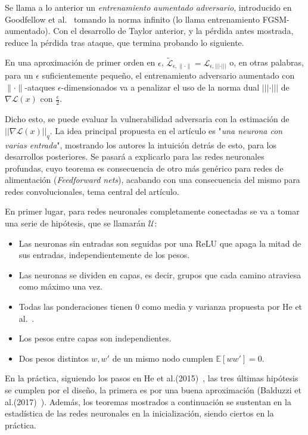 Se llama a lo anterior un \textit{entrenamiento aumentado adversario}, introducido en Goodfellow et al.~\cite{GoodfLAdvers} tomando la norma infinito (lo llama entrenamiento FGSM-aumentado). Con el desarrollo de Taylor anterior, y la pérdida antes mostrada, reduce la pérdida tras ataque, que termina probando lo siguiente.

\begin{proposicion}
En una aproximación de primer orden en $\epsilon$, $\tilde{\mathcal{L}}_{\epsilon,\| \cdot \|}=\mathcal{L}_{\epsilon,|||\cdot|||}$ o, en otras palabras, para un $\epsilon$ suficientemente pequeño, el entrenamiento adversario aumentado con $\| \cdot \|$-ataques $\epsilon$-dimensionados va a penalizar el uso de la norma dual $|||\cdot |||$ de $\nabla \mathcal{L}(x)$ con $\frac{\epsilon}{2}$.
\end{proposicion}

Dicho esto, se puede evaluar la vulnerabilidad adversaria con la estimación de $||\nabla \mathcal{L}(x)||_q$. La idea principal propuesta en el artículo es "\textit{una neurona con varias entrada}", mostrando los autores la intuición detrás de esto, para los desarrollos posteriores. Se pasará a explicarlo para las redes neuronales profundas, cuyo teorema es consecuencia de otro más genérico para redes de alimentación (\textit{Feedforward nets}), acabando con una consecuencia del mismo para redes convolucionales, tema central del artículo.

En primer lugar, para redes neuronales completamente conectadas se va a tomar una serie de hipótesis, que se llamarán $\mathcal{U}$:
\begin{itemize}
	\item  Las neuronas sin entradas son seguidas por una ReLU que apaga la mitad de sus entradas, independientemente de los pesos.
	\item Las neuronas se dividen en capas, es decir, grupos
que cada camino atraviesa como máximo una vez.
	\item Todas las ponderaciones tienen 0 como media y varianza propuesta por He et al.~\cite{HeLAdvers}.
	\item Los pesos entre capas son independientes.
	\item Dos pesos distintos $w,w'$ de un mismo nodo cumplen $\mathbb{E}[ww']=0$.
\end{itemize}

En la práctica, siguiendo los pasos en He et al.(2015)~\cite{HeLAdvers}, las tres últimas hipótesis se cumplen por el diseño, la primera es por una buena aproximación (Balduzzi et al.(2017)~\cite{BalduzziLAdvers}). Además, los teoremas mostrados a continuación se sustentan en la estadística de las redes neuronales en la inicialización, siendo ciertos en la práctica.

